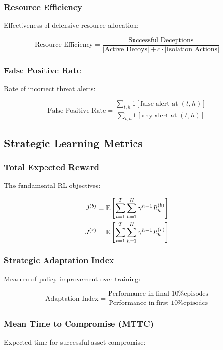 \documentclass[12pt,oneside,a4paper]{article}
\theoremstyle{definition}
\theoremstyle{plain}
\begin{document}
\subsubsection{Resource Efficiency}
Effectiveness of defensive resource allocation:

\begin{equation}
\text{Resource Efficiency} = \frac{\text{Successful Deceptions}}{|\text{Active Decoys}| + c \cdot |\text{Isolation Actions}|}
\end{equation}

\subsubsection{False Positive Rate}
Rate of incorrect threat alerts:

\begin{equation}
\text{False Positive Rate} = \frac{\sum_{t,h} \mathbf{1}[\text{false alert at } (t,h)]}{\sum_{t,h} \mathbf{1}[\text{any alert at } (t,h)]}
\end{equation}

\subsection{Strategic Learning Metrics}

\subsubsection{Total Expected Reward}
The fundamental RL objectives:

\begin{align}
J^{(b)} &= \mathbb{E}\left[\sum_{t=1}^{T} \sum_{h=1}^{H} \gamma^{h-1} R_h^{(b)}\right] \\
J^{(r)} &= \mathbb{E}\left[\sum_{t=1}^{T} \sum_{h=1}^{H} \gamma^{h-1} R_h^{(r)}\right]
\end{align}

\subsubsection{Strategic Adaptation Index}
Measure of policy improvement over training:

\begin{equation}
\text{Adaptation Index} = \frac{\text{Performance in final 10\% episodes}}{\text{Performance in first 10\% episodes}}
\end{equation}

\subsubsection{Mean Time to Compromise (MTTC)}
Expected time for successful asset compromise:
\end{document}
